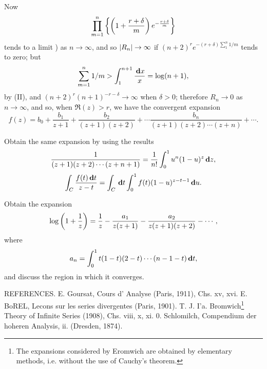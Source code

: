 Now
$$
\prod_{m=1}^{n}
\left\{ 
  \left( 
    1
    +
    \frac{r + \delta}{m}
   \right)
  e^{-\frac{r+\delta}{m}}
 \right\}
$$
tends to a limit ) as
$n \rightarrow \infty$, and so $\left| R_{n} \right| \rightarrow \infty$
if
$ (n+2)^{r} e^{-(r+\delta) \sum_{1}^{n} 1/m} $
tends to zero; but
$$
\sum_{m=1}^{n} 1/m
>
\int_{1}^{n+1} \frac{\, \mathbf{d} x}{x}
=
\log(n+1),
$$
by (II), %
and $(n + 2)^{r} (n+1)^{-r-\delta} \rightarrow \infty$ when
$\delta > 0$; therefore $R_{n} \rightarrow 0$ as
$n \rightarrow \infty$, and so, when $\Re(z) > r$,
we have the convergent expansion
$$
f(z)
=
b_{0}
+
\frac{b_{1}}{z+1}
+
\frac{b_{2}}{(z+1)(z+2)}
+
\cdots
\frac{b_{n}}{(z+1)(z+2)\cdots(z+n)}
+
\cdots.
$$
\begin{wandwexample}
Obtain the same expansion by using the results
$$
\frac{1}{(z+1)(z+2)\cdots(z+n+1)}
=
\frac{1}{n!}
\int_{0}^{1} u^{n} (1-u)^{z} \, \mathbf{d} z,
$$
$$
\int_{C}
\frac{ f(t) \, \mathbf{d} t }{z - t}
=
\int_{C} \, \mathbf{d} t
\int_{0}^{1}
f(t) (1-u)^{z-t-1} \, \mathbf{d} u.
$$
\end{wandwexample}
\begin{wandwexample}
Obtain the expansion
$$
\log\left( 1 + \frac{1}{z} \right)
=
\frac{1}{z}
-
\frac{a_{1}}{z(z+1)}
-
\frac{a_{2}}{z(z+1)(z+2)}
-
\cdots,
$$
where
$$
a_{n}
=
\int_{0}^{1}
t (1-t) (2-t) \cdots (n-1-t) \, \mathbf{d} t,
$$
and discuss the region in which it converges.
\end{wandwexample}

REFERENCES. E. Goursat, Cours d' Analyse (Paris, 1911), Chs. xv, xvi.
E. BoREL, Lecons sur les series divergentes (Paris, 1901). T. J. I'a.
Bromwich\footnote{The expansions considered by Eromwich are obtained by elementary
methods, i.e. without the use of Cauchy's theorem.} Theory of Infinite
Series (1908), Chs. viii, x, xi. 0.
Schlomilch, Compendium der hoheren Analysis, ii. (Dresden, 1874).

